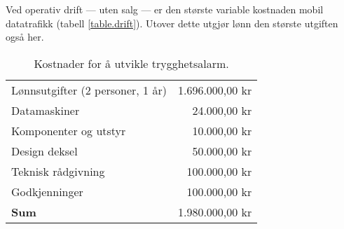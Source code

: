 Ved operativ drift --- uten salg --- er den største variable kostnaden mobil
datatrafikk (tabell \vref{table.drift}). Utover dette utgjør lønn den største
utgiften også her.

\begin{table}
  \centering
  \begin{tabular}{lr}
    Lønnsutgifter (2 personer, 1 år) &  1.696.000,00 kr \\
    Datamaskiner                     &     24.000,00 kr \\
    Komponenter og utstyr            &     10.000,00 kr \\
    Design deksel                    &     50.000,00 kr \\
    Teknisk rådgivning               &    100.000,00 kr \\
    Godkjenninger                    &    100.000,00 kr \\
    \textbf{Sum}                     &  1.980.000,00 kr \\
  \end{tabular}
  \caption{Kostnader for å utvikle trygghetsalarm.}
  \label{table.kostnad.alarm}
\end{table}

